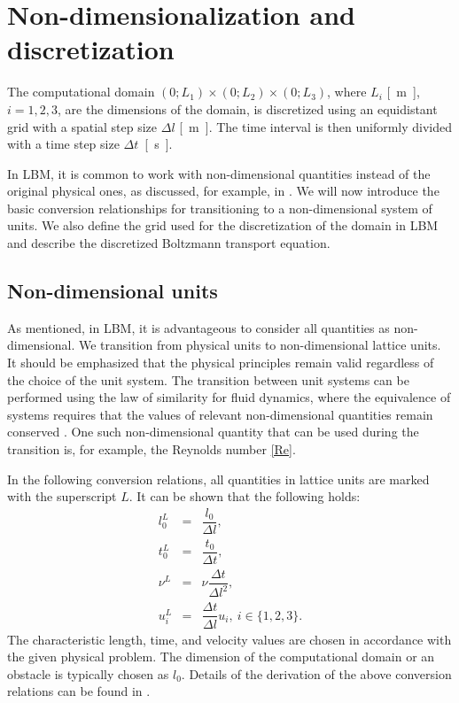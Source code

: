 \section{Non-dimensionalization and discretization}
The computational domain \( (0 ; L_1) \times(0 ; L_2) \times(0 ; L_3)\), where \( L_i\) \si{[m]}, $i=1,2,3$,  are the dimensions of the domain, is discretized using an equidistant grid with a spatial step size \( \Delta l \) \si{[m]}. The time interval is then uniformly divided with a time step size \( \Delta t \)~\si{[s]}.

In LBM, it is common to work with non-dimensional quantities instead of the original physical ones, as discussed, for example, in \cite{Kruger}. We will now introduce the basic conversion relationships for transitioning to a non-dimensional system of units. We also define the grid used for the discretization of the domain in LBM and describe the discretized Boltzmann transport equation.

\subsection{Non-dimensional units}
As mentioned, in LBM, it is advantageous to consider all quantities as non-dimensional. We transition from physical units to non-dimensional lattice units. It should be emphasized that the physical principles remain valid regardless of the choice of the unit system. The transition between unit systems can be performed using the law of similarity for fluid dynamics, where the equivalence of systems requires that the values of relevant non-dimensional quantities remain conserved \cite{Kruger}. One such non-dimensional quantity that can be used during the transition is, for example, the Reynolds number \eqref{Re}.

In the following conversion relations, all quantities in lattice units are marked with the superscript \( L \). It can be shown \cite{Kruger} that the following holds:
\begin{eqnarray}
	l^{L}_0 &=& \dfrac{l_{0}}{\Delta l},\\[5pt]
	t^{L}_0 &=& \dfrac{t_{0}}{\Delta t},\\[5pt]
	\nu^L &=& \nu \dfrac{\Delta t}{\Delta l^{2}},\\[5pt]
	u^{L}_{i} &=& \dfrac{\Delta t}{\Delta l} u_{i}, \ i \in \{1, 2, 3\}.
\end{eqnarray}
The characteristic length, time, and velocity values are chosen in accordance with the given physical problem. The dimension of the computational domain or an obstacle is typically chosen as \( l_{0} \). Details of the derivation of the above conversion relations can be found in \cite{Kruger}.


